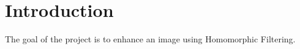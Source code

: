 \section{Introduction}

The goal of the project is to enhance an image using Homomorphic Filtering. 